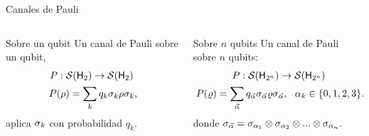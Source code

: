 \begin{frame}{Canales de Pauli}
    \begin{columns}
        \begin{column}{0.5\textwidth}
            \begin{block}{Sobre un qubit}
            Un canal de Pauli sobre un qubit,
            \begin{equation}
                \begin{gathered}
                P:\densityspace{2} \rightarrow \densityspace{2}\nonumber\pause\\
                P(\rho)=\sum_{k}q_{k}\pauli{k}\rho\pauli{k} \rlap{,}
                \end{gathered}
            \end{equation}\pause
            aplica $\sigma_{k}$ con probabilidad $q_{k}$.
        \end{block}
        \end{column}
        \pause
        \begin{column}{0.5\textwidth}
            \begin{block}{Sobre $n$ qubits}
            Un canal de Pauli sobre $n$ qubits:
            \begin{equation}
                \begin{gathered}
                P:\densityspace{2^{n}} \rightarrow \densityspace{2^{n}}\nonumber\pause\\
                P(\varrho)=\sum_{\vec{\alpha}}q_{\vec{\alpha}}\pauli{\vec{\alpha}}\varrho\pauli{\vec{\alpha}},\pause \,\text{ }\, \alpha_{k}\in\{0,1,2,3\} \rlap{.}
                \end{gathered}
            \end{equation}\pause
            donde  $\sigma_{\vec{\alpha}}=\sigma_{\alpha_{1}}\otimes\sigma_{\alpha_{2}}\otimes...\otimes \sigma_{\alpha_{n}}$.
        \end{block}
        \end{column}
    \end{columns}
\end{frame}

